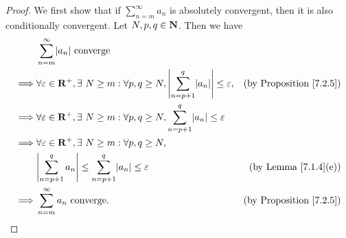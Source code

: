 \begin{proof}
    We first show that if \(\sum_{n = m}^\infty a_n\) is absolutely convergent, then it is also conditionally convergent.
    Let \(N, p, q \in \mathbf{N}\).
    Then we have
    \begin{align*}
                 & \sum_{n = m}^\infty \abs{a_n} \text{ converge}                                                                                                                    \\
        \implies & \forall \varepsilon \in \R^+, \exists\ N \geq m : \forall p, q \geq N, \abs{\sum_{n = p + 1}^q \abs{a_n}} \leq \varepsilon, & \text{(by Proposition \ref{7.2.5})} \\
        \implies & \forall \varepsilon \in \R^+, \exists\ N \geq m : \forall p, q \geq N, \sum_{n = p + 1}^q \abs{a_n} \leq \varepsilon                                              \\
        \implies & \forall \varepsilon \in \R^+, \exists\ N \geq m : \forall p, q \geq N,                                                                                            \\
                 & \abs{\sum_{n = p + 1}^q a_n} \leq \sum_{n = p + 1}^q \abs{a_n} \leq \varepsilon                                             & \text{(by Lemma \ref{7.1.4}(e))}    \\
        \implies & \sum_{n = m}^\infty a_n \text{ converge}.                                                                                   & \text{(by Proposition \ref{7.2.5})}
    \end{align*}


\end{proof}
